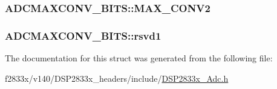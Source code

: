 \subsubsection[{M\+A\+X\+\_\+\+C\+O\+N\+V2}]{ A\+D\+C\+M\+A\+X\+C\+O\+N\+V\+\_\+\+B\+I\+T\+S\+::\+M\+A\+X\+\_\+\+C\+O\+N\+V2}\label{struct_a_d_c_m_a_x_c_o_n_v___b_i_t_s_a2165132365d31614881684035d3ffca0}
\hypertarget{struct_a_d_c_m_a_x_c_o_n_v___b_i_t_s_a15d220a23e0b7f7fa89b06c99a924e92}{}
\subsubsection[{rsvd1}]{ A\+D\+C\+M\+A\+X\+C\+O\+N\+V\+\_\+\+B\+I\+T\+S\+::rsvd1}\label{struct_a_d_c_m_a_x_c_o_n_v___b_i_t_s_a15d220a23e0b7f7fa89b06c99a924e92}


The documentation for this struct was generated from the following file\+:\begin{DoxyCompactItemize}
\item 
f2833x/v140/\+D\+S\+P2833x\+\_\+headers/include/\hyperlink{_d_s_p2833x___adc_8h}{D\+S\+P2833x\+\_\+\+Adc.\+h}\end{DoxyCompactItemize}
